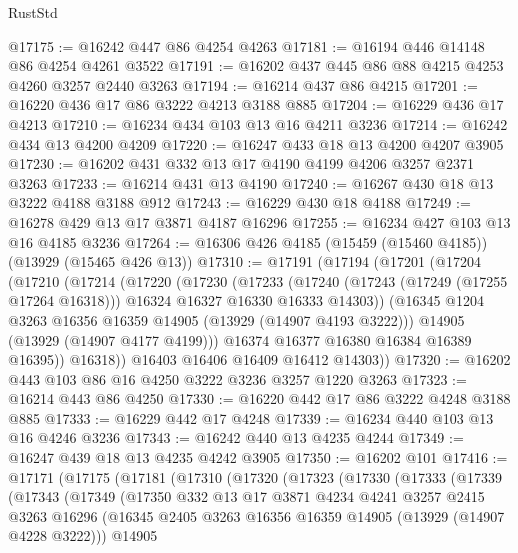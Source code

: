 \begin{lexlean}{RustStd}
\begin{coremodule}
{\begin{coremodule}
{{{{{{{{{{{{{{{{{{{{{{{{{{{{{{{{{{{{{@17175 := @16242 @447 @86 @4254 @4263
@17181 := @16194 @446 @14148 @86 @4254 @4261 @3522
@17191 := @16202 @437 @445 @86 @88 @4215 @4253 @4260 @3257 @2440 @3263
@17194 := @16214 @437 @86 @4215
@17201 := @16220 @436 @17 @86 @3222 @4213 @3188 @885
@17204 := @16229 @436 @17 @4213
@17210 := @16234 @434 @103 @13 @16 @4211 @3236
@17214 := @16242 @434 @13 @4200 @4209
@17220 := @16247 @433 @18 @13 @4200 @4207 @3905
@17230 := @16202 @431 @332 @13 @17 @4190 @4199 @4206 @3257 @2371 @3263
@17233 := @16214 @431 @13 @4190
@17240 := @16267 @430 @18 @13 @3222 @4188 @3188 @912
@17243 := @16229 @430 @18 @4188
@17249 := @16278 @429 @13 @17 @3871 @4187 @16296
@17255 := @16234 @427 @103 @13 @16 @4185 @3236
@17264 := @16306 @426 @4185 (@15459 (@15460 @4185)) (@13929 (@15465 @426 @13))
@17310 := @17191
    (@17194
      (@17201
        (@17204
          (@17210
            (@17214
              (@17220
                (@17230
                  (@17233
                    (@17240
                      (@17243 (@17249 (@17255 @17264 @16318)))
                      @16324
                      @16327
                      @16330
                      @16333
                      @14303))
                  (@16345 @1204 @3263 @16356 @16359 @14905 (@13929 (@14907 @4193 @3222)))
                  @14905
                  (@13929 (@14907 @4177 @4199)))
                @16374
                @16377
                @16380
                @16384
                @16389
                @16395))
            @16318))
        @16403
        @16406
        @16409
        @16412
        @14303))
@17320 := @16202 @443 @103 @86 @16 @4250 @3222 @3236 @3257 @1220 @3263
@17323 := @16214 @443 @86 @4250
@17330 := @16220 @442 @17 @86 @3222 @4248 @3188 @885
@17333 := @16229 @442 @17 @4248
@17339 := @16234 @440 @103 @13 @16 @4246 @3236
@17343 := @16242 @440 @13 @4235 @4244
@17349 := @16247 @439 @18 @13 @4235 @4242 @3905
@17350 := @16202 @101
@17416 := @17171
    (@17175
      (@17181
        (@17310
          (@17320
            (@17323
              (@17330
                (@17333
                  (@17339
                    (@17343
                      (@17349
                        (@17350
                          @332
                          @13
                          @17
                          @3871
                          @4234
                          @4241
                          @3257
                          @2415
                          @3263
                          @16296
                          (@16345 @2405 @3263 @16356 @16359 @14905 (@13929 (@14907 @4228 @3222)))
                          @14905
}}}}}}}}}}}}}}}}}}}}}}}}}}}}}}}}}}}}}
\end{coremodule}}
\end{coremodule}
\end{lexlean}
